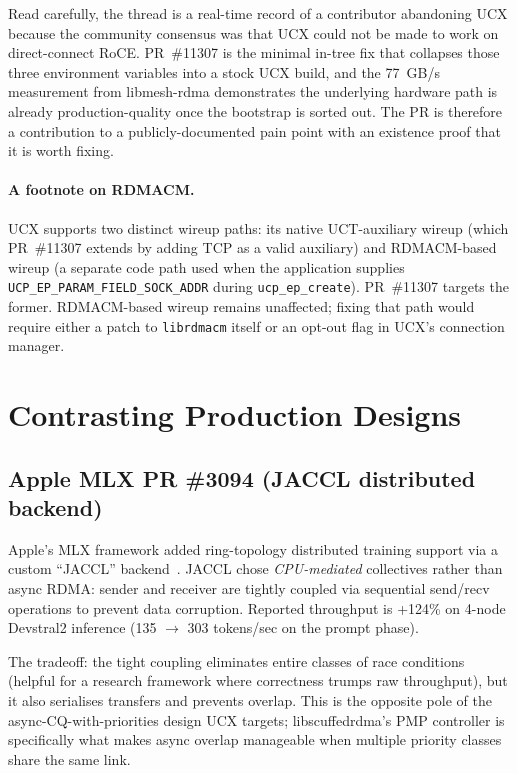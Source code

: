 \documentclass[11pt]{article}
\begin{document}
Read carefully, the thread is a real-time record of a contributor
abandoning UCX because the community consensus was that UCX could not
be made to work on direct-connect RoCE. PR~\#11307 is the minimal
in-tree fix that collapses those three environment variables into a
stock UCX build, and the 77~GB/s measurement from libmesh-rdma
demonstrates the underlying hardware path is already
production-quality once the bootstrap is sorted out. The PR is
therefore a contribution to a publicly-documented pain point with an
existence proof that it is worth fixing.

\paragraph{A footnote on RDMACM.} UCX supports two distinct wireup
paths: its native UCT-auxiliary wireup (which PR~\#11307 extends by
adding TCP as a valid auxiliary) and RDMACM-based wireup (a separate
code path used when the application supplies
\texttt{UCP\_EP\_PARAM\_FIELD\_SOCK\_ADDR} during
\texttt{ucp\_ep\_create}). PR~\#11307 targets the former. RDMACM-based
wireup remains unaffected; fixing that path would require either a
patch to \texttt{librdmacm} itself or an opt-out flag in UCX's
connection manager.

\section{Contrasting Production Designs}

\subsection{Apple MLX PR \#3094 (JACCL distributed backend)}

Apple's MLX framework added ring-topology distributed training support
via a custom ``JACCL'' backend~\cite{mlx_pr3094}. JACCL chose
\emph{CPU-mediated} collectives rather than async RDMA: sender and
receiver are tightly coupled via sequential send/recv operations to
prevent data corruption. Reported throughput is +124\% on 4-node
Devstral2 inference (135 $\to$ 303 tokens/sec on the prompt phase).

The tradeoff: the tight coupling eliminates entire classes of
race conditions (helpful for a research framework where correctness
trumps raw throughput), but it also serialises transfers and
prevents overlap. This is the opposite pole of the
async-CQ-with-priorities design UCX targets; libscuffedrdma's PMP
controller is specifically what makes async overlap manageable when
multiple priority classes share the same link.
\end{document}
